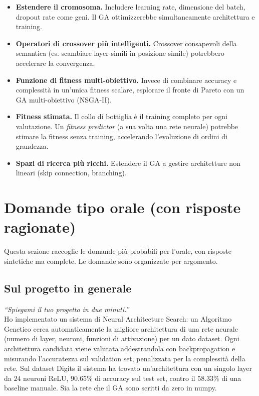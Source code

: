 \documentclass[11pt,a4paper]{article}
\begin{document}
\begin{itemize}
    \item \textbf{Estendere il cromosoma.} Includere learning rate,
          dimensione del batch, dropout rate come geni. Il GA
          ottimizzerebbe simultaneamente architettura e training.
    \item \textbf{Operatori di crossover più intelligenti.} Crossover
          consapevoli della semantica (es. scambiare layer simili in
          posizione simile) potrebbero accelerare la convergenza.
    \item \textbf{Funzione di fitness multi-obiettivo.} Invece di
          combinare accuracy e complessità in un'unica fitness scalare,
          esplorare il fronte di Pareto con un GA multi-obiettivo
          (NSGA-II).
    \item \textbf{Fitness stimata.} Il collo di bottiglia è il training
          completo per ogni valutazione. Un \emph{fitness predictor} (a
          sua volta una rete neurale) potrebbe stimare la fitness senza
          training, accelerando l'evoluzione di ordini di grandezza.
    \item \textbf{Spazi di ricerca più ricchi.} Estendere il GA a gestire
          architetture non lineari (skip connection, branching).
\end{itemize}

\newpage

\section{Domande tipo orale (con risposte ragionate)}

Questa sezione raccoglie le domande più probabili per l'orale, con
risposte sintetiche ma complete. Le domande sono organizzate per
argomento.

\subsection{Sul progetto in generale}

\begin{domanda}
\textit{``Spiegami il tuo progetto in due minuti.''}\\
Ho implementato un sistema di Neural Architecture Search: un Algoritmo
Genetico cerca automaticamente la migliore architettura di una rete
neurale (numero di layer, neuroni, funzioni di attivazione) per un dato
dataset. Ogni architettura candidata viene valutata addestrandola con
backpropagation e misurando l'accuratezza sul validation set, penalizzata
per la complessità della rete. Sul dataset Digits il sistema ha trovato
un'architettura con un singolo layer da $24$ neuroni ReLU, $90.65\%$ di
accuracy sul test set, contro il $58.33\%$ di una baseline manuale. Sia la
rete che il GA sono scritti da zero in numpy.
\end{domanda}
\end{document}

